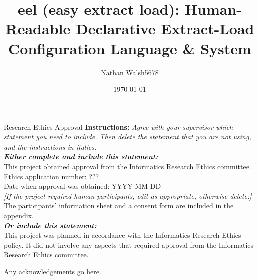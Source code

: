 \documentclass[logo,msc,inf]{infthesis}     %
\begin{document}
\begin{preliminary}

    \title{eel (easy extract load): Human-Readable Declarative Extract-Load Configuration Language \& System}

    \author{Nathan Walsh5678}

    \date{\today}

    \abstract{
        
    }

    \maketitle

    \newenvironment{ethics}
    {\begin{frontenv}{Research Ethics Approval}{\LARGE}}
            {\end{frontenv}\newpage}

    \begin{ethics}
        \textbf{Instructions:} \emph{Agree with your supervisor which
            statement you need to include. Then delete the statement that you are not using,
            and the instructions in italics.\\
            \textbf{Either complete and include this statement:}}\\ %
        This project obtained approval from the Informatics Research Ethics committee.\\
        Ethics application number: ???\\
        Date when approval was obtained: YYYY-MM-DD\\
        \emph{[If the project required human participants, edit as appropriate, otherwise delete:]}\\ %
        The participants' information sheet and a consent form are included in the appendix.\\
        \textbf{\emph{Or include this statement:}}\\ %
        This project was planned in accordance with the Informatics Research
        Ethics policy. It did not involve any aspects that required approval
        from the Informatics Research Ethics committee.

        \standarddeclaration
    \end{ethics}


    \begin{acknowledgements}
        Any acknowledgements go here.
    \end{acknowledgements}


    \tableofcontents
\end{preliminary}
\end{document}
